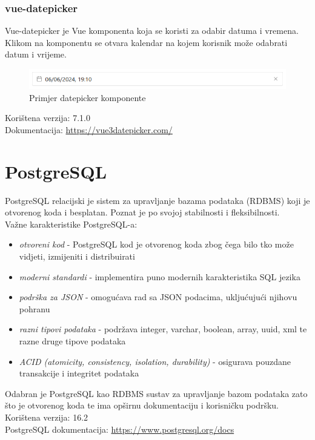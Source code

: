 \documentclass[zavrsnirad]{fer}
\begin{document}
\subsubsection{vue-datepicker}
Vue-datepicker je Vue komponenta koja se koristi za odabir datuma i vremena. Klikom na komponentu se otvara kalendar na kojem korisnik može odabrati datum i vrijeme.
\begin{figure}[htb]
	\centering
	\includegraphics[width=1\linewidth]{images/datepicker_example.png} 
	\caption{Primjer datepicker komponente}
	\label{slk:datepicker_example}
\end{figure}
\FloatBarrier
Korištena verzija: 7.1.0
\\Dokumentacija: \url{https://vue3datepicker.com/}

\section{PostgreSQL}
\label{pog:postgresql}
PostgreSQL relacijski je sistem za upravljanje bazama podataka (RDBMS) koji je otvorenog koda i besplatan. Poznat je po svojoj stabilnosti i fleksibilnosti.
\\Važne karakteristike PostgreSQL-a:
\begin{itemize}
	\item \textit{otvoreni kod} - PostgreSQL kod je otvorenog koda zbog čega bilo tko može vidjeti, izmijeniti i distribuirati
	\item \textit{moderni standardi} - implementira puno modernih karakteristika SQL jezika
	\item \textit{podrška za JSON} - omogućava rad sa JSON podacima, ukljućujući njihovu pohranu
	\item \textit{razni tipovi podataka} - podržava integer, varchar, boolean, array, uuid, xml te razne druge tipove podataka
	\item \textit{ACID (atomicity, consistency, isolation, durability)} - osigurava pouzdane transakcije i integritet podataka
\end{itemize}
Odabran je PostgreSQL kao RDBMS sustav za upravljanje bazom podataka zato što je otvorenog koda te ima opširnu dokumentaciju i korisničku podršku.
\\Korištena verzija: 16.2
\\PostgreSQL dokumentacija: \url{https://www.postgresql.org/docs}
\end{document}
